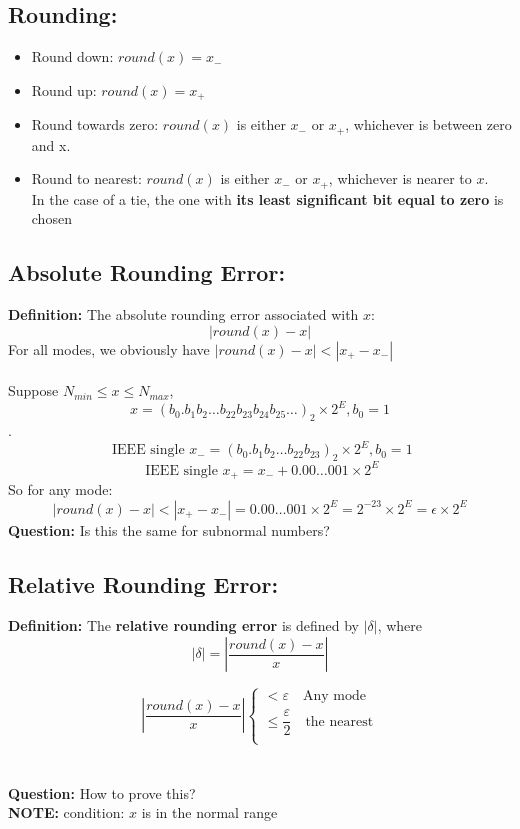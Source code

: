 \documentclass [9 pt]{article}
\theoremstyle{definition}
\begin{document}
\newpage
\subsection*{Rounding:}
\begin{itemize}
	\item Round down: $round(x) = x_{-}$
	\item Round up: $round(x) = x_{+}$
	\item Round towards zero: $round(x)$ is either $x_{-}$ or $x_{+}$, whichever is between zero and x.
	\item Round to nearest: $round(x)$ is either $x_{-}$ or $x_{+}$, whichever is nearer to $x$.\\
	 In the case of a tie, the one with \textbf{ its least significant bit equal to zero } is chosen

\end{itemize}

\subsection*{Absolute Rounding Error:}
\textbf{Definition:} The absolute rounding error associated with $x$:
$$ | round(x) - x | $$
For all modes, we obviously have $ | round(x) - x | < |x_{+} - x_{-}|  $\\
\\
Suppose $N_{min} \leq x \leq N_{max}$,
$$x=(b_0.b_1b_2\ldots b_{22}b_{23}b_{24}b_{25} \ldots )_2 \times 2^E, b_0=1$$.
$$ \text{ IEEE single } x_{-} = (b_0.b_1b_2\ldots b_{22}b_{23} )_2 \times 2^E, b_0=1   $$
$$ \text{ IEEE single } x_{+} = x_{-} + 0.00 \ldots 001 \times 2^E $$
So for any mode:
$$ | round(x) - x | < |x_{+} - x_{-}| = 0.00 \ldots 001 \times 2^E = 2^{-23} \times 2^E  = \epsilon \times 2^E $$
\textbf{ Question: } Is this the same for subnormal numbers?



\subsection*{Relative Rounding Error: }
\textbf{Definition:} The \textbf{relative rounding error} is defined by $|\delta|$, where
$$ |\delta| = |\dfrac{round(x) - x}{x}| $$

\begin{equation}
|\dfrac{round(x) - x}{x}|   \left\{
             \begin{array}{lr}
            < \varepsilon \quad \text{Any mode}\\
			\leq \dfrac{\varepsilon}{2} \quad \text{the nearest}\\ 
             \end{array}
\right.
\end{equation}
\\
\\
\textbf{Question: } How to prove this?\\
\textbf{NOTE:} condition: $x$ is in the normal range
\end{document}
